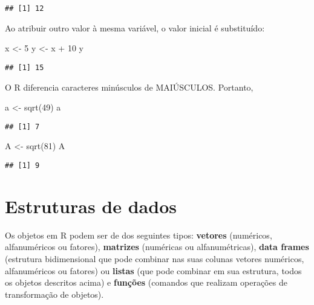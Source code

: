 \documentclass[
]{book}
\newenvironment{Shaded}{\begin{snugshade}}{\end{snugshade}}
\newcommand{\DecValTok}[1]{\textcolor[rgb]{0.00,0.00,0.81}{#1}}
\newcommand{\FunctionTok}[1]{\textcolor[rgb]{0.00,0.00,0.00}{#1}}
\newcommand{\NormalTok}[1]{#1}
\newcommand{\OtherTok}[1]{\textcolor[rgb]{0.56,0.35,0.01}{#1}}
\newcommand{\SpecialCharTok}[1]{\textcolor[rgb]{0.00,0.00,0.00}{#1}}
\begin{document}
\begin{verbatim}
## [1] 12
\end{verbatim}

Ao atribuir outro valor à mesma variável, o valor inicial é substituído:

\begin{Shaded}
\begin{Highlighting}[]
\NormalTok{x }\OtherTok{\textless{}{-}} \DecValTok{5}
\NormalTok{y }\OtherTok{\textless{}{-}}\NormalTok{ x }\SpecialCharTok{+} \DecValTok{10}
\NormalTok{y}
\end{Highlighting}
\end{Shaded}

\begin{verbatim}
## [1] 15
\end{verbatim}

O R diferencia caracteres minúsculos de MAIÚSCULOS. Portanto,

\begin{Shaded}
\begin{Highlighting}[]
\NormalTok{a }\OtherTok{\textless{}{-}} \FunctionTok{sqrt}\NormalTok{(}\DecValTok{49}\NormalTok{)}
\NormalTok{a}
\end{Highlighting}
\end{Shaded}

\begin{verbatim}
## [1] 7
\end{verbatim}

\begin{Shaded}
\begin{Highlighting}[]
\NormalTok{A }\OtherTok{\textless{}{-}} \FunctionTok{sqrt}\NormalTok{(}\DecValTok{81}\NormalTok{)}
\NormalTok{A}
\end{Highlighting}
\end{Shaded}

\begin{verbatim}
## [1] 9
\end{verbatim}

\hypertarget{estruturas-de-dados}{%
\section{Estruturas de dados}\label{estruturas-de-dados}}

Os objetos em R podem ser de dos seguintes tipos: \textbf{vetores} (numéricos, alfanuméricos ou fatores), \textbf{matrizes} (numéricas ou alfanumétricas), \textbf{data frames} (estrutura bidimensional que pode combinar nas suas colunas vetores numéricos, alfanuméricos ou fatores) ou \textbf{listas} (que pode combinar em sua estrutura, todos os objetos descritos acima) e \textbf{funções} (comandos que realizam operações de transformação de objetos).
\end{document}
